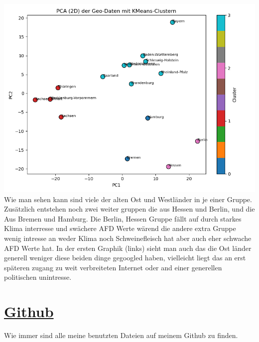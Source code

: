 \documentclass[a4paper,12pt]{scrartcl}
\begin{document}
\includegraphics*[scale=0.4]{PCA_KLI.png}\\

Wie man sehen kann sind viele der alten Ost und Westländer in je einer Gruppe. Zusätzlich entstehen noch zwei weiter gruppen die aus Hessen und Berlin, und die Aus Bremen und Hamburg. Die Berlin, Hessen Gruppe fällt auf durch starkes Klima interresse und swächere AFD Werte wärend die andere extra Gruppe wenig intresse an weder Klima noch Schweinefleisch hat aber auch eher schwache AFD Werte hat. In der ersten Graphik (links) sieht man auch das die Ost länder generell weniger diese beiden dinge gegoogled haben, vielleicht liegt das an erst späteren zugang zu weit verbreiteten Internet oder and einer generellen politischen unintresse.

\section*{\href{https://github.com/7hands/Angewandte-Modellierung-25-Colmant}{Github}}
Wie immer sind alle meine benutzten Dateien auf meinem Github zu finden. 
\end{document}
